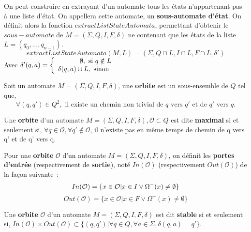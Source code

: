 \begin{Definition}
  On peut construire en extrayant d'un automate tous les états n'appartenant pas 
  à une liste d'état. On appellera cette automate, un 
  \textbf{sous-automate d'état}. On définit alors la fonction 
  \(extractListStateAutomata\), permettant d'obtenir le \(sous-automate\) de 
  \(M = (\Sigma, Q, I, F, \delta)\) ne contenant que les états de la liste 
  \(L = (q_0, \dots, q_{n-1})\).
  \[
    extractListStateAutomata(M, L) = (\Sigma, Q \cap L, I \cap L, F \cap L, 
    \delta')
  \]
  Avec \(\delta'(q, a) = \left \{
    \begin{array}{r c l}
      \emptyset, \text{ si } q \notin L\\
      \delta(q, a) \cup L, \text{ sinon } \\
    \end{array}
    \right .\)
\end{Definition}

\begin{Definition}
  Soit un automate \(M = (\Sigma, Q, I, F, \delta)\), une \textbf{orbite} est un 
  sous-ensemble de \(Q\) tel que, 
  \[
    \forall (q, q') \in Q^2, \text{ il existe un chemin non trivial de } q 
    \text{ vers } q' \text{ et de } q' \text{ vers } q.
  \]
\end{Definition}

\begin{Definition}
  Une \textbf{orbite} d'un automate \(M = (\Sigma, Q, I, F, \delta), \mathcal{O} 
  \subset Q\) est dite \textbf{maximal} si et seulement si, 
  \(\forall q \in \mathcal{O}, \forall q' \notin \mathcal{O}\), il n'existe pas 
  en même temps de chemin de q vers q' et de q' vers q.  
\end{Definition}

\begin{Definition}
  Pour une \textbf{orbite} \(\mathcal{O}\) d'un automate \(M = (\Sigma, Q, I, F, 
  \delta)\), on définit les \textbf{portes d'entrée} (respectivement de 
  \textbf{sortie}), noté \(In(\mathcal{O})\) (respectivement 
  \(Out(\mathcal{O})\)) de la façon suivante~:
  \[
    In(\mathcal{O}) = \{x \in \mathcal{O} | x \in I \lor \Omega^{-}(x) \neq
    \emptyset\}\\
  \]
  \[
    Out(\mathcal{O}) = \{x \in \mathcal{O} | x \in F \lor \Omega^{+}(x) \neq
    \emptyset\}
  \]
\end{Definition}

\begin{Definition}
  Une \textbf{orbite} \(\mathcal{O}\) d'un automate \(M = (\Sigma, Q, I, F, 
  \delta)\) est dit \textbf{stable} si et seulement si, \(In(\mathcal{O}) 
  \times Out(\mathcal{O}) \subset \{(q, q') | \forall q \in Q, \forall a \in 
  \Sigma, \delta(q, a) = q'\}\).
\end{Definition}

